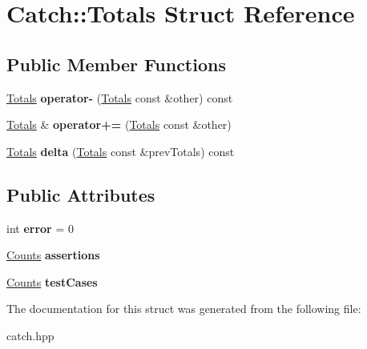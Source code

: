 \hypertarget{struct_catch_1_1_totals}{}\section{Catch\+:\+:Totals Struct Reference}
\label{struct_catch_1_1_totals}
\subsection*{Public Member Functions}
\begin{DoxyCompactItemize}
\item 
\mbox{\label{struct_catch_1_1_totals_a9279ed39139cb7e7b291918a6d08290e}} 
\mbox{\hyperlink{struct_catch_1_1_totals}{Totals}} {\bfseries operator-\/} (\mbox{\hyperlink{struct_catch_1_1_totals}{Totals}} const \&other) const
\item 
\mbox{\label{struct_catch_1_1_totals_a574015076e54cc405c70b053e3356e43}} 
\mbox{\hyperlink{struct_catch_1_1_totals}{Totals}} \& {\bfseries operator+=} (\mbox{\hyperlink{struct_catch_1_1_totals}{Totals}} const \&other)
\item 
\mbox{\label{struct_catch_1_1_totals_a1a94a654f5f3786b75695e081fc9bca2}} 
\mbox{\hyperlink{struct_catch_1_1_totals}{Totals}} {\bfseries delta} (\mbox{\hyperlink{struct_catch_1_1_totals}{Totals}} const \&prev\+Totals) const
\end{DoxyCompactItemize}
\subsection*{Public Attributes}
\begin{DoxyCompactItemize}
\item 
\mbox{\label{struct_catch_1_1_totals_a6ea14c7de7ea735a14f172a26e08a239}} 
int {\bfseries error} = 0
\item 
\mbox{\label{struct_catch_1_1_totals_a885ded66df752147b30c3d45aa602ec9}} 
\mbox{\hyperlink{struct_catch_1_1_counts}{Counts}} {\bfseries assertions}
\item 
\mbox{\label{struct_catch_1_1_totals_adb195fe477aedee2ecea88c888f16506}} 
\mbox{\hyperlink{struct_catch_1_1_counts}{Counts}} {\bfseries test\+Cases}
\end{DoxyCompactItemize}


The documentation for this struct was generated from the following file\+:\begin{DoxyCompactItemize}
\item 
catch.\+hpp\end{DoxyCompactItemize}
